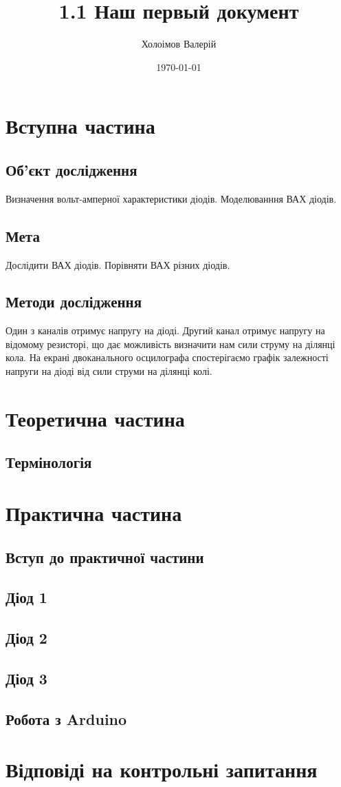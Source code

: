 \documentclass[a4paper,12pt]{article}
\author{Холоімов Валерій}
\title{1.1 Наш первый документ}
\date{\today}
\begin{document}




\tableofcontents

\newpage

\section{Вступна частина}
\subsection{Об'єкт дослідження}
Визначення вольт-амперної характеристики діодів. Моделюванння ВАХ діодів.
\subsection{Мета}
Дослідити ВАХ діодів. Порівняти ВАХ різних діодів.
\subsection{Методи дослідження}
Один з каналів отримує напругу на діоді. Другий канал отримує напругу на відомому резисторі, що дає можливість визначити нам сили струму на ділянці кола. На екрані двоканального осцилографа спостерігаємо графік залежності напруги на діоді від сили струми на ділянці колі.

\section{Теоретична частина}
\subsection{Термінологія}

\newpage


\section{Практична частина}
\subsection{Вступ до практичної частини}

\newpage
\subsection{Діод 1}

\newpage
\subsection{Діод 2}

\newpage
\subsection{Діод 3}

\newpage
\subsection{Робота з Arduino}

\newpage






\section{Відповіді на контрольні запитання}


\end{document}
